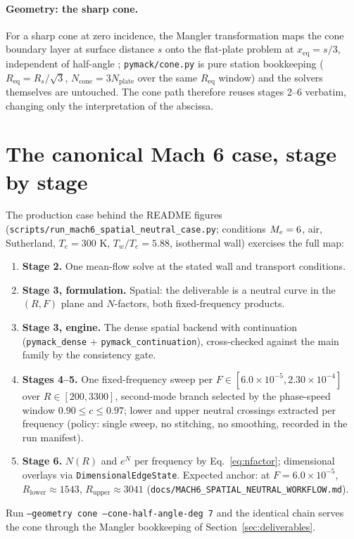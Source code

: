 \documentclass[11pt]{article}
\begin{document}
\paragraph{Geometry: the sharp cone.} For a sharp cone at zero incidence, the Mangler
transformation maps the cone boundary layer at surface distance $s$ onto the flat-plate problem
at $x_{\mathrm{eq}}=s/3$, independent of half-angle \cite{mack1984}; \texttt{pymack/cone.py} is
pure station bookkeeping ($R_{\mathrm{eq}}=R_s/\sqrt3$, $N_{\mathrm{cone}}=3N_{\mathrm{plate}}$
over the same $R_{\mathrm{eq}}$ window) and the solvers themselves are untouched. The cone path
therefore reuses stages 2--6 verbatim, changing only the interpretation of the abscissa.

\section{The canonical Mach 6 case, stage by stage}\label{sec:mach6}
The production case behind the README figures
(\texttt{scripts/run\_mach6\_spatial\_neutral\_case.py}; conditions $M_e=6$, air, Sutherland,
$T_e=300$ K, $T_w/T_e=5.88$, isothermal wall) exercises the full map:
\begin{enumerate}[nosep,leftmargin=1.8em]
  \item \textbf{Stage 2.} One mean-flow solve at the stated wall and transport conditions.
  \item \textbf{Stage 3, formulation.} Spatial: the deliverable is a neutral curve in the
        $(R,F)$ plane and $N$-factors, both fixed-frequency products.
  \item \textbf{Stage 3, engine.} The dense spatial backend with continuation
        (\texttt{pymack\_dense} + \texttt{pymack\_continuation}), cross-checked against the main
        family by the consistency gate.
  \item \textbf{Stages 4--5.} One fixed-frequency sweep per $F\in[6.0\times10^{-5},
        2.30\times10^{-4}]$ over $R\in[200,3300]$, second-mode branch selected by the
        phase-speed window $0.90\le c\le0.97$; lower and upper neutral crossings extracted per
        frequency (policy: single sweep, no stitching, no smoothing, recorded in the run
        manifest).
  \item \textbf{Stage 6.} $N(R)$ and $e^N$ per frequency by Eq.~\eqref{eq:nfactor}; dimensional
        overlays via \texttt{DimensionalEdgeState}. Expected anchor: at $F=6.0\times10^{-5}$,
        $R_{\mathrm{lower}}\approx1543$, $R_{\mathrm{upper}}\approx3041$
        (\texttt{docs/MACH6\_SPATIAL\_NEUTRAL\_WORKFLOW.md}).
\end{enumerate}
Run \texttt{--geometry cone --cone-half-angle-deg 7} and the identical chain serves the cone
through the Mangler bookkeeping of Section~\ref{sec:deliverables}.
\end{document}
